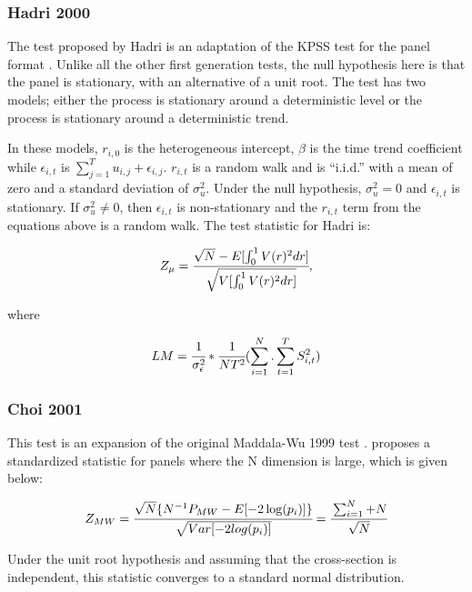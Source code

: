 \subsubsection{Hadri 2000}

The test proposed by Hadri is an adaptation of the KPSS test for the panel format \citep{hadri2000testing}. Unlike all the other first generation tests, the null hypothesis here is that the panel is stationary, with an alternative of a unit root. The test has two models; either the process is stationary around a deterministic level or the process is stationary around a deterministic trend.





In these models, $r_{i,0}$ is the heterogeneous intercept, $\beta$ is the time trend coefficient while $\epsilon_{i,t}$ is $\sum_{j=1}^{T} u_{i,j}+ \epsilon_{i,j}$. $r_{i,t}$  is a random walk and is “i.i.d.” with a mean of zero and a standard deviation of $\sigma_u^2$. Under the null hypothesis, $\sigma_u^2 = 0$ and $\epsilon_{i,t}$ is stationary. If $\sigma_u^2 \neq 0$, then $\epsilon_{i,t}$ is non-stationary and the $r_{i,t}$ term from the equations above is a random walk.  The test statistic for Hadri is:

\begin{equation}
Z_\mu = \cfrac{\sqrt{N}-E[\int_{0}^{1}V(r)^2dr]}{\sqrt{V[\int_{0}^{1}V(r)^2dr]}} ,
\end{equation}

where

\begin{equation}
LM = \cfrac{1}{\sigma_{\epsilon}^2} * \cfrac{1}{NT^2}(\sum_{i=1}^{N} . \sum_{t=1}^{T} S^2_{i,t})
\end{equation}

\subsubsection{Choi 2001}

This test is an expansion of the original Maddala-Wu 1999 test \citep{choi2001unit}. \citet{choi2001unit} proposes a standardized statistic for panels where the N dimension is large, which is given below:

\begin{equation}
Z_{MW} = \cfrac{\sqrt{N}\{N^{-1}P_{MW}-E[-2\log(p_i)]\}}{\sqrt{Var[-2log(p_i)]}} = \cfrac{\sum_{i=1}^{N}+N}{\sqrt{N}}
\end{equation}

Under the unit root hypothesis and assuming that the cross-section is independent, this statistic converges to a standard normal distribution.

